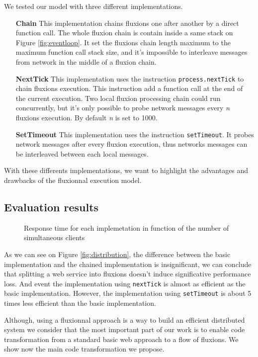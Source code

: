 We tested our model with three different implementations.

\begin{itemize}
	\item[\textbf{Chain}]
		This implementation chains fluxions one after another by a direct function call.
		The whole fluxion chain is contain inside a same stack on Figure \ref{fig:eventloop}.
		It set the fluxions chain length maximum to the maximum function call stack size, and it's impossible to interleave messages from network in the middle of a fluxion chain.

	\item[\textbf{NextTick}]
		This implementation uses the instruction \texttt{process.nextTick} to chain fluxions execution.
		This instruction add a function call at the end of the current execution.
		Two local fluxion processing chain could run concurrently, but it's only possible to probe network messages every \textit{n} fluxions execution.
		By default \textit{n} is set to 1000.

	\item[\textbf{SetTimeout}]
		This implementation uses the instruction \texttt{setTimeout}.
		It probes network messages after every fluxion execution, thus networks messages can be interleaved between each local messages.
\end{itemize}

With these differents implementations, we want to highlight the advantages and drawbacks of the fluxionnal execution model.

\subsection{Evaluation results}

% 

\begin{figure}

\caption{Response time for each implemetation in function of the number of simultaneous clients}
\label{fig:timecountsetTimeout}
\end{figure}

As we can see on Figure \ref{fig:distribution}, the difference between the basic implementation and the chained implementation is insignificant, we can conclude that splitting a web service into fluxions doesn't induce significative performance loss.
And event the implementation using \texttt{nextTick} is almost as efficient as the basic implementation.
However, the implementation using \texttt{setTimeout} is about 5 times less efficient than the basic implementation.

\TODO{}
Although, using a fluxionnal approach is a way to build an efficient distributed system we consider that the most important part of our work is to enable code transformation from a standard basic web approach to a flow of fluxions.
We show now the main code transformation we propose.